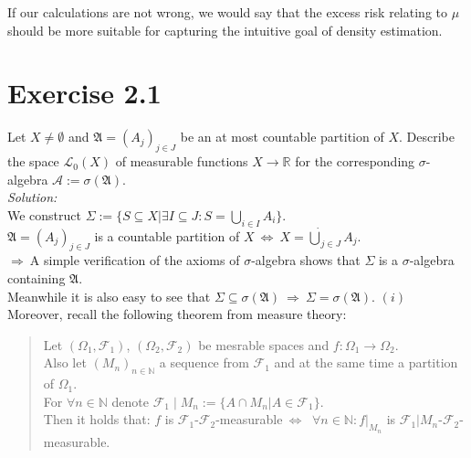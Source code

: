 \documentclass{article}
\begin{document}
$\quad$\vspace*{-0.7cm}\\
If our calculations are not wrong, we would say that the excess risk relating to $\mu$ should be more suitable for capturing the intuitive goal of density estimation. \\




\section*{Exercise 2.1}
Let $X \neq \emptyset$ and $\mathfrak{A} = (A_j)_{j\in J}$ be an at most countable partition of $X$. Describe the space $\mathcal{L}_0(X)$ of measurable functions $X \rightarrow \mathbb{R}$ for the corresponding $\sigma$-algebra $\mathcal{A}:=\sigma (\mathfrak{A})$. \\
\textit{Solution: }\\
We construct $\Sigma:=\{ S \subseteq X | \exists I\subseteq J : S = \bigcup_{i\in I} A_i\} $.\\ 
$\mathfrak{A} = (A_j)_{j\in J}$ is a countable partition of $X \ \Leftrightarrow \ X = \dot{\bigcup}_{j \in J} A_j$.\\
$\Rightarrow \ $A simple verification of the axioms of $\sigma$-algebra shows that $\Sigma$ is a $\sigma$-algebra containing $\mathfrak{A}$. \\
Meanwhile it is also easy to see that $\Sigma \subseteq \sigma(\mathfrak{A}) \ \Rightarrow \ \Sigma = \sigma(\mathfrak{A}) $.\hspace{5cm} $(i)$ \\
Moreover, recall the following theorem from measure theory: \\ \vspace*{-2.5em}
\begin{quote}
Let $(\Omega_1, \mathcal{F}_1)$, $(\Omega_2, \mathcal{F}_2)$ be mesrable spaces and  $f:\Omega_1 \rightarrow \Omega_2$.\\
Also let $(M_n)_{n\in \mathbb{N}}$ a sequence from $\mathcal{F}_1$ and at the same time a partition of $\Omega_1$. \\
For $\forall n\in \mathbb{N} $ denote $\mathcal{F}_1 \; | \; M_n := \{ A\cap M_n | A\in \mathcal{F}_1 \}$. \\
Then it holds that: $f$ is $\mathcal{F}_1$-$\mathcal{F}_2$-measurable$\ \Leftrightarrow \ $ $\forall n \in \mathbb{N}: f|_{M_n}$ is $\mathcal{F}_1 |M_n$-$\mathcal{F}_2$-measurable.\\
\end{quote} \vspace*{-2.5em}
\end{document}
